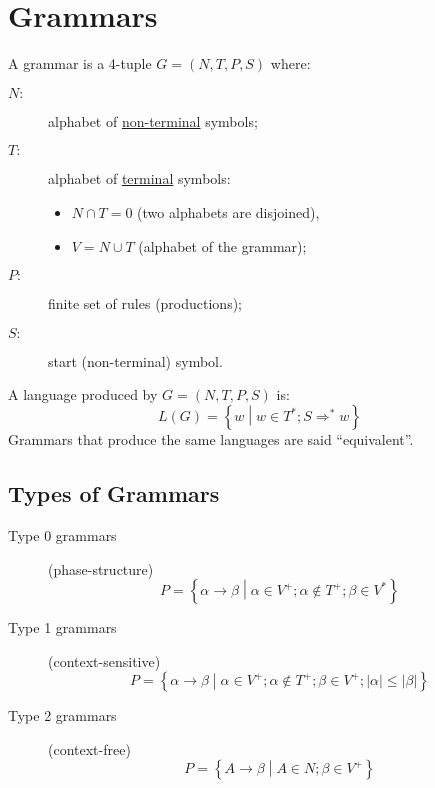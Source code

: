 \section{Grammars}
A grammar is a 4-tuple $G = (N, T, P, S)$ where:
\begin{description}
	\item[$N:$] alphabet of \underline{non-terminal} symbols;
	\item[$T:$] alphabet of \underline{terminal} symbols:
	\begin{itemize}
		\item $N \cap T = 0$ (two alphabets are disjoined),
		\item $V = N \cup T$ (alphabet of the grammar);
	\end{itemize}
	\item[$P:$] finite set of rules (productions);
	\item[$S:$] start (non-terminal) symbol.
\end{description}

A language produced by $G = (N, T, P, S)$ is:
$$
	L(G) = \left\{w \middle| w \in T^\ast; S \Rightarrow^\ast w\right\}
$$
Grammars that produce the same languages are said ``equivalent''.

\subsection{Types of Grammars}
\begin{description}
	\item[Type 0 grammars] (phase-structure)
		$$
			P = \left\{\alpha \to \beta \middle| \alpha \in V^+; \alpha \notin T^+; \beta \in V^\ast \right\}
		$$
	\item[Type 1 grammars] (context-sensitive)
		$$
			P = \left\{\alpha \to \beta \middle| \alpha \in V^+; \alpha \notin T^+; \beta \in V^+; |\alpha| \leq |\beta| \right\}
		$$
	\item[Type 2 grammars] (context-free)
		$$
			P = \left\{A \to \beta \middle| A \in N; \beta \in V^+ \right\}
		$$
\end{description}

